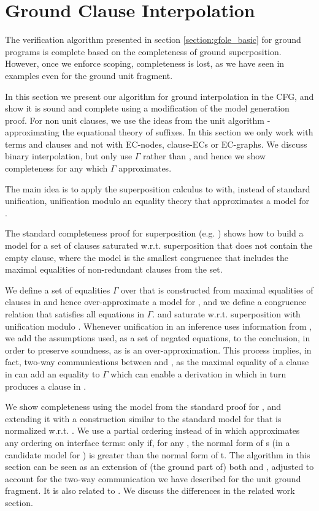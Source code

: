 \newpage
\section{Ground Clause Interpolation}\label{section:scoping:gfole}
The verification algorithm presented in section \ref{section:gfole_basic} for ground programs is complete based on the completeness of ground superposition. However, once we enforce scoping, completeness is lost, as we have seen in examples even for the ground unit fragment.

In this section we present our algorithm for ground interpolation in the CFG, and show it is sound and complete using a modification of the model generation proof.
For non unit clauses, we use the ideas from the unit algorithm - approximating the equational theory of suffixes.
In this section we only work with terms and clauses and not with EC-nodes, clause-ECs or EC-graphs.
We discuss binary interpolation, but only use $\Gamma$ rather than , 
and hence we show completeness for any  which $\Gamma$ approximates.

The main idea is to apply the superposition calculus to  with, instead of standard unification,
 unification modulo an equality theory that approximates a model for .

The standard completeness proof for superposition (e.g. \cite{BachmairGanzingerSuperposition}) shows how to build a model for a set of clauses saturated w.r.t. superposition that does not contain the empty clause, where the model is the smallest congruence that includes the maximal equalities of non-redundant clauses from the set. 

We define a set of equalities $\Gamma$ over \langI{} that is constructed from maximal equalities of clauses in  and hence over-approximate a model for , and we define a congruence relation \eqg{} that satisfies all equations in $\Gamma$.
and saturate  w.r.t. superposition with unification modulo \eqg{}.
Whenever unification in an inference uses information from \eqg{}, we add the assumptions used, as a set of negated equations, to the conclusion, in order to preserve soundness, as \m{=_{\Gamma}} is an over-approximation.
This process implies, in fact, two-way communications between  and , as the maximal equality of a clause in  can add an equality to $\Gamma$ which can enable a derivation in  which in turn produces a clause in .

We show completeness using the model from the standard proof for , and extending it with a construction similar to the standard model for  that is normalized w.r.t. .
We use a partial ordering  instead of \m{\succ} in  which approximates any ordering on interface terms: 
 only if, for any , the normal form of s (in a candidate model for ) is greater than the normal form of t.
The algorithm in this section can be seen as an extension of (the ground part of) both \cite{McMillan08} and \cite{BaumgartnerWaldmann13}, 
adjusted to account for the two-way communication we have described for the unit ground fragment. It is also related to \cite{KovacsVoronkov09}.
We discuss the differences in the related work section.

